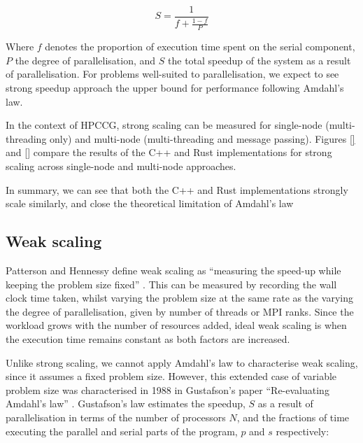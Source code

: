 \begin{equation}
    S = \frac{1}{f + \frac{1-f}{P}}
\end{equation}

Where $f$ denotes the proportion of execution time spent on the serial component, $P$ the degree of parallelisation, and $S$ the total speedup of the system as a result of parallelisation. For problems well-suited to parallelisation, we expect to see strong speedup approach the upper bound for performance following Amdahl's law.


In the context of HPCCG, strong scaling can be measured for single-node (multi-threading only) and multi-node (multi-threading and message passing). Figures \ref{} and \ref{} compare the results of the C++ and Rust implementations for strong scaling across single-node and multi-node approaches.


In summary, we can see that both the C++ and Rust implementations strongly scale similarly, and close the theoretical limitation of Amdahl's law

\subsection{Weak scaling}
\label{ssec:weak-scaling}

Patterson and Hennessy define weak scaling as ``measuring the speed-up while keeping the problem size fixed'' \cite{pattersonHennessyComputerOrganisationArchitecture}. This can be measured by recording the wall clock time taken, whilst varying the problem size at the same rate as the varying the degree of parallelisation, given by number of threads or MPI ranks. Since the workload grows with the number of resources added, ideal weak scaling is when the execution time remains constant as both factors are increased.

Unlike strong scaling, we cannot apply Amdahl's law to characterise weak scaling, since it assumes a fixed problem size. However, this extended case of variable problem size was characterised in 1988 in Gustafson's paper ``Re-evaluating Amdahl's law'' \cite{gustafsonReevaluatingAmdahlLaw1988}. Gustafson's law estimates the speedup, $S$ as a result of parallelisation in terms of the number of processors $N$, and the fractions of time executing the parallel and serial parts of the program, $p$ and $s$ respectively:


